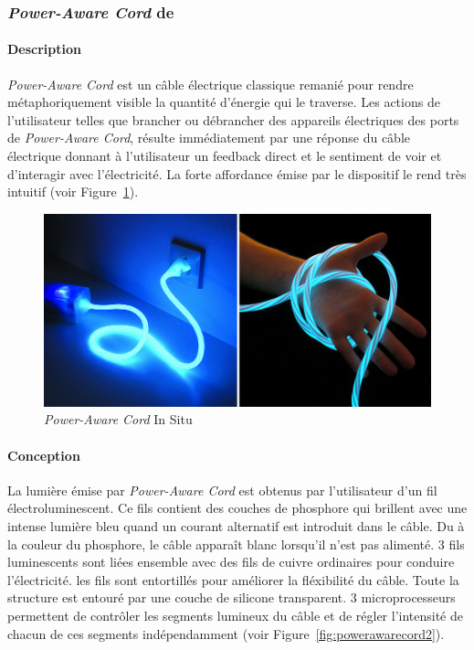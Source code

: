 \documentclass[10pt,a5paper,twoside]{article}
\begin{document}
\subsubsection{\emph{Power-Aware Cord} de
\citet{gustafsson2005power}}\label{power-aware-cord-de-gustafsson2005power}

\paragraph{Description}\label{description-6}

\emph{Power-Aware Cord} est un câble électrique classique remanié pour
rendre métaphoriquement visible la quantité d'énergie qui le traverse.
Les actions de l'utilisateur telles que brancher ou débrancher des
appareils électriques des ports de \emph{Power-Aware Cord}, résulte
immédiatement par une réponse du câble électrique donnant à
l'utilisateur un feedback direct et le sentiment de voir et d'interagir
avec l'électricité. La forte affordance émise par le dispositif le rend
très intuitif (voir Figure~\ref{fig:powerawarecord1}).

\begin{figure}
\centering
\includegraphics[]{images/powerawarecord-screenshot1.png}
\caption{\emph{Power-Aware Cord} In Situ}\label{fig:powerawarecord1}
\end{figure}

\paragraph{Conception}\label{conception-6}

La lumière émise par \emph{Power-Aware Cord} est obtenus par
l'utilisateur d'un fil électroluminescent. Ce fils contient des couches
de phosphore qui brillent avec une intense lumière bleu quand un courant
alternatif est introduit dans le câble. Du à la couleur du phosphore, le
câble apparaît blanc lorsqu'il n'est pas alimenté. 3 fils luminescents
sont liées ensemble avec des fils de cuivre ordinaires pour conduire
l'électricité. les fils sont entortillés pour améliorer la fléxibilité
du câble. Toute la structure est entouré par une couche de silicone
transparent. 3 microprocesseurs permettent de contrôler les segments
lumineux du câble et de régler l'intensité de chacun de ces segments
indépendamment (voir Figure~\ref{fig:powerawarecord2}).
\end{document}
